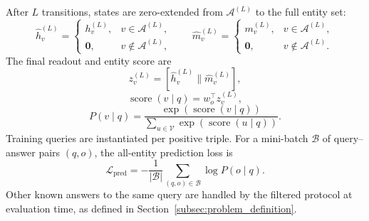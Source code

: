 \documentclass[a4paper,fleqn]{cas-sc}
\begin{document}
After $L$ transitions, states are zero-extended from $\mathcal{A}^{(L)}$ to the
full entity set:
\begin{equation}
\widehat h_v^{(L)}
=
\begin{cases}
h_v^{(L)}, & v\in\mathcal{A}^{(L)},\\
\mathbf{0}, & v\notin\mathcal{A}^{(L)},
\end{cases}
\qquad
\widehat m_v^{(L)}
=
\begin{cases}
m_v^{(L)}, & v\in\mathcal{A}^{(L)},\\
\mathbf{0}, & v\notin\mathcal{A}^{(L)}.
\end{cases}
\label{eq:full_entity_extension}
\end{equation}
The final readout and entity score are
\begin{equation}
z_v^{(L)}
=
[\widehat h_v^{(L)}\|\widehat m_v^{(L)}],
\end{equation}
\begin{equation}
\operatorname{score}(v\mid q)=w_o^\top z_v^{(L)},
\end{equation}
\begin{equation}
P(v\mid q)
=
\frac{\exp(\operatorname{score}(v\mid q))}
{\sum_{u\in\mathcal{V}}\exp(\operatorname{score}(u\mid q))}.
\label{eq:all_entity_probability}
\end{equation}
Training queries are instantiated per positive triple. For a mini-batch
$\mathcal{B}$ of query--answer pairs $(q,o)$, the all-entity prediction loss is
\begin{equation}
\mathcal{L}_{\mathrm{pred}}
=
-\frac{1}{|\mathcal{B}|}
\sum_{(q,o)\in\mathcal{B}}
\log P(o\mid q).
\end{equation}
Other known answers to the same query are handled by the filtered protocol at
evaluation time, as defined in Section~\ref{subsec:problem_definition}.
\end{document}
